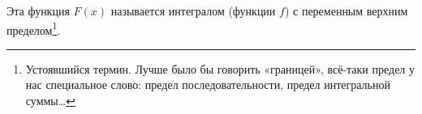 
    	Эта функция $F(x)$ называется интегралом (функции $f$) с переменным верхним пределом\footnote{Устоявшийся термин. Лучше было бы
    	говорить «границей», всё-таки предел у нас специальное слово: предел последовательности, предел интегральной суммы\ldots}.
    